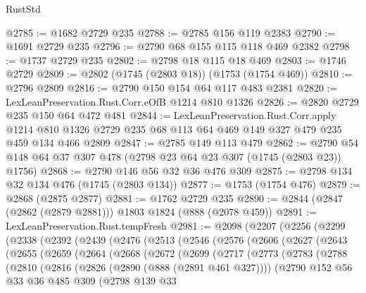 \begin{lexlean}{RustStd}
\begin{coremodule}
@2785 := @1682 @2729 @235
@2788 := @2785 @156 @119 @2383
@2790 := @1691 @2729 @235
@2796 := @2790 @68 @155 @115 @118 @469 @2382
@2798 := @1737 @2729 @235
@2802 := @2798 @18 @115 @18 @469
@2803 := @1746 @2729
@2809 := @2802 (@1745 (@2803 @18)) (@1753 (@1754 @469))
@2810 := @2796 @2809
@2816 := @2790 @150 @154 @64 @117 @483 @2381
@2820 := LexLeanPreservation.Rust.Corr.eOfB @1214 @810 @1326
@2826 := @2820 @2729 @235 @150 @64 @472 @481
@2844 := LexLeanPreservation.Rust.Corr.apply
    @1214
    @810
    @1326
    @2729
    @235
    @68
    @113
    @64
    @469
    @149
    @327
    @479
    @235
    @459
    @134
    @466
    @2809
@2847 := @2785 @149 @113 @479
@2862 := @2790 @54 @148 @64 @37 @307 @478 (@2798 @23 @64 @23 @307 (@1745 (@2803 @23)) @1756)
@2868 := @2790 @146 @56 @32 @36 @476 @309
@2875 := @2798 @134 @32 @134 @476 (@1745 (@2803 @134))
@2877 := @1753 (@1754 @476)
@2879 := @2868 (@2875 @2877)
@2881 := @1762 @2729 @235
@2890 := @2844 (@2847 (@2862 (@2879 @2881))) @1803 @1824 (@888 (@2078 @459))
@2891 := LexLeanPreservation.Rust.tempFresh
@2981 := @2098
    (@2207
      (@2256
        (@2299
          (@2338
            (@2392
              (@2439
                (@2476
                  (@2513
                    (@2546
                      (@2576
                        (@2606
                          (@2627
                            (@2643
                              (@2655
                                (@2659
                                  (@2664
                                    (@2668
                                      (@2672
                                        (@2699
                                          (@2717
                                            (@2773
                                              (@2783
                                                (@2788
                                                  (@2810
                                                    (@2816
                                                      (@2826 (@2890 (@888 (@2891 @461 @327))))
                                                      (@2790
                                                        @152
                                                        @56
                                                        @33
                                                        @36
                                                        @485
                                                        @309
                                                        (@2798
                                                          @139
                                                          @33

\end{coremodule}
\end{lexlean}
